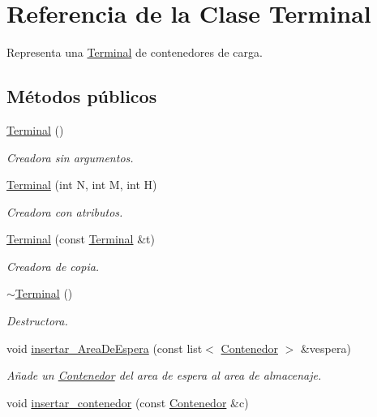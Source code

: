 \hypertarget{class_terminal}{}\section{Referencia de la Clase Terminal}
\label{class_terminal}


Representa una \hyperlink{class_terminal}{Terminal} de contenedores de carga.  


\subsection*{Métodos públicos}
\begin{DoxyCompactItemize}
\item 
\hyperlink{class_terminal_aa448509b5aa1ece53c3d86385655be0e}{Terminal} ()
\begin{DoxyCompactList}\small\item\em Creadora sin argumentos. \end{DoxyCompactList}\item 
\hyperlink{class_terminal_a696ee89f0fc7359b528c9f8f2aec064f}{Terminal} (int N, int M, int H)
\begin{DoxyCompactList}\small\item\em Creadora con atributos. \end{DoxyCompactList}\item 
\hyperlink{class_terminal_a2502d3b03ed7f7f479b73e6575dedbf0}{Terminal} (const \hyperlink{class_terminal}{Terminal} \&t)
\begin{DoxyCompactList}\small\item\em Creadora de copia. \end{DoxyCompactList}\item 
\hyperlink{class_terminal_add5a7d4dd45b68af9a0afb1cc845af2f}{$\sim$\+Terminal} ()
\begin{DoxyCompactList}\small\item\em Destructora. \end{DoxyCompactList}\item 
void \hyperlink{class_terminal_a7b12f84e1eeb3dacb6d73f6126bb13e1}{insertar\+\_\+\+Area\+De\+Espera} (const list$<$ \hyperlink{class_contenedor}{Contenedor} $>$ \&vespera)
\begin{DoxyCompactList}\small\item\em Añade un \hyperlink{class_contenedor}{Contenedor} del area de espera al area de almacenaje. \end{DoxyCompactList}\item 
void \hyperlink{class_terminal_a0448a45cc3dea91ab383c79246c9e50e}{insertar\+\_\+contenedor} (const \hyperlink{class_contenedor}{Contenedor} \&c)

\end{DoxyCompactItemize}
